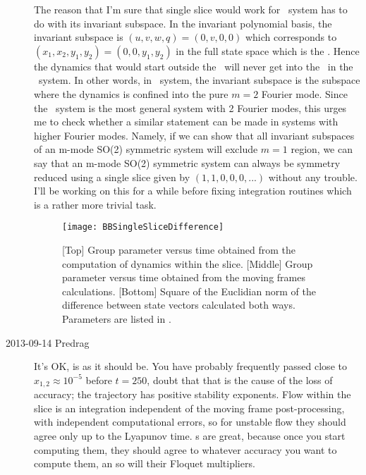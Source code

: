 \begin{description}
The reason that I'm sure that single slice would work for \twoMode\ system has to do with its invariant subspace. In the invariant polynomial basis, the invariant subspace is $(u,v,w,q) = (0,v,0,0)$ which corresponds to $(x_1,x_2,y_1,y_2) = (0,0,y_1,y_2)$ in the full state space which is the \chartBord. Hence the dynamics that would start outside the \chartBord\ will never get into the \chartBord\ in the \twoMode\ system. In other words, in \twoMode\ system, the invariant subspace is the subspace where the dynamics is confined into the pure $m=2$ Fourier mode. Since the \twoMode\ system is the most general system with 2 Fourier modes, this urges me to check whether a similar statement can be made in systems with higher Fourier modes. Namely, if we can show that all invariant subspaces of an m-mode SO(2) symmetric system will exclude $m = 1$ region, we can say that an m-mode SO(2) symmetric system can always be symmetry reduced using a single slice given by $(1,1,0,0,0,...)$ without any trouble. I'll be working on this for a while before fixing integration routines which is a rather more trivial task.

\begin{figure}%
  \begin{center}
  \texttt{[image: BBSingleSliceDifference]}
  \end{center}
  \caption{
  [Top] Group parameter versus time obtained from the computation of
  dynamics within the slice. [Middle] Group parameter versus time
  obtained from the moving frames calculations. [Bottom] Square of
  the Euclidian norm of the difference between state vectors
  calculated both ways. Parameters are listed in .
  }
  \label{fig:BBSingleSliceDifference}
\end{figure}

\item[2013-09-14 Predrag] It's OK, 
is as it should be. You have probably frequently passed close to $x_{1,2} \approx 10^{-5}$
before $t=250$, doubt that that is the cause of the loss of accuracy;
the trajectory has positive stability exponents.
Flow within the slice is an integration independent
of the moving frame post-processing, with independent computational
errors, so for unstable flow they should agree only up to the Lyapunov
time. \Rpo s are great, because once you start computing them, they should
agree to whatever accuracy you want to compute them, an so will their
Floquet multipliers.



\end{description}
